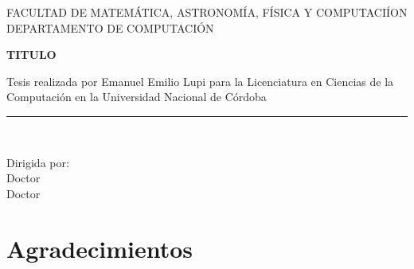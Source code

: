 \documentclass[a4paper,openright,12pt, oneside]{book}
\begin{document}
\begin{titlepage}

\begin{center}
\vspace*{-1in}


FACULTAD DE MATEM\'ATICA, ASTRONOM\'IA, F\'ISICA Y COMPUTACI\'ION\\
\vspace*{0.15in}
DEPARTAMENTO DE COMPUTACI\'ON \\
\vspace*{0.6in}
\begin{large}
\end{large}
\vspace*{0.2in}
\begin{Large}
\textbf{TITULO} \\
\end{Large}
\vspace*{0.3in}
\begin{large}
Tesis realizada por Emanuel Emilio Lupi para la Licenciatura en Ciencias de la Computaci\'on en la Universidad Nacional de C\'ordoba\end{large}

\vspace*{0.3in}
\rule{80mm}{0.1mm}\\
\vspace*{0.1in}
\begin{large}
Dirigida por: \\
Doctor\\
Doctor\\
\vspace*{0.1in}
\end{large}
\end{center}
\end{titlepage}

\mbox{}
\thispagestyle{empty}

\chapter*{Agradecimientos} %
\end{document}
